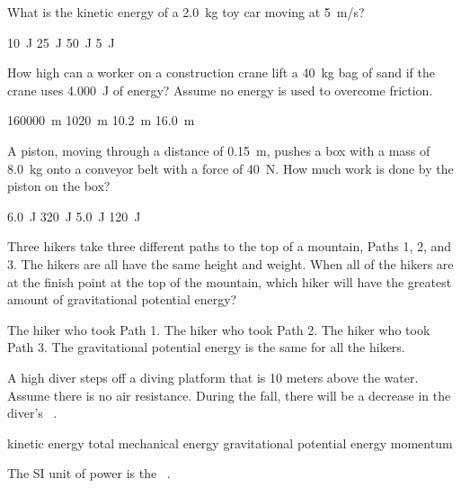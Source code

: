 \documentclass{exam}
\begin{document}
\begin{questions}
\question
What is the kinetic energy of a \SI{2.0}{kg} toy car moving at \SI{5}{m/s}?

\begin{randomizeoneparchoices}
\choice \SI{10}{J}
\correctchoice \SI{25}{J}
\choice \SI{50}{J}
\choice \SI{5}{J}
\end{randomizeoneparchoices}

\question
How high can a worker on a construction crane lift a \SI{40}{kg} bag of sand if the crane uses \SI{4,000}{J} of energy? Assume no energy is used to overcome friction.

\begin{randomizeoneparchoices}
\choice \SI{160000}{m}
\choice \SI{1020}{m}
\correctchoice \SI{10.2}{m}
\choice \SI{16.0}{m}
\end{randomizeoneparchoices}

\question
A piston, moving through a distance of \SI{0.15}{m}, pushes a box with a mass of \SI{8.0}{kg} onto a conveyor belt with a force of \SI{40}{N}. How much work is done by the piston on the box?

\begin{randomizeoneparchoices}
\correctchoice \SI{6.0}{J}
\choice \SI{320}{J}
\choice \SI{5.0}{J}
\choice \SI{120}{J}
\end{randomizeoneparchoices}

\question
Three hikers take three different paths to the top of a mountain, Paths 1, 2, and 3. The hikers are all have the same height and weight. When all of the hikers are at the finish point at the top of the mountain, which hiker will have the greatest amount of gravitational potential energy?

\begin{randomizechoices}
\choice The hiker who took Path 1. 
\choice The hiker who took Path 2.
\choice The hiker who took Path 3.
\choice The gravitational potential energy is the same for all the hikers.
\end{randomizechoices}

\question
A high diver steps off a diving platform that is 10 meters above the water. Assume there is no air resistance. During the fall, there will be a decrease in the diver's \fillin\ .

\begin{randomizechoices}
\choice kinetic energy
\choice total mechanical energy
\correctchoice gravitational potential energy
\choice momentum
\end{randomizechoices}

\question
The SI unit of power is the \fillin\ .


\end{questions}
\end{document}
